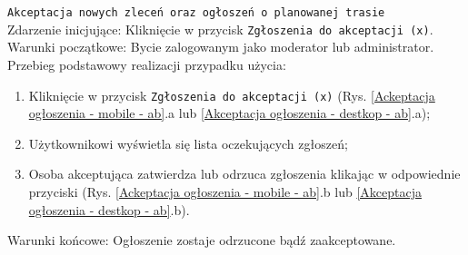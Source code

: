  \texttt{Akceptacja nowych zleceń oraz ogłoszeń o planowanej trasie} \\
 Zdarzenie inicjujące: Kliknięcie w przycisk \texttt{Zgłoszenia do akceptacji (x)}. \\
 Warunki początkowe: Bycie zalogowanym jako moderator lub administrator. \\
 Przebieg podstawowy realizacji przypadku użycia: \\
 \begin{enumerate}
    \item Kliknięcie w przycisk \texttt{Zgłoszenia do akceptacji (x)} (Rys. \ref{Ackeptacja ogłoszenia - mobile - ab}.a lub \ref{Akceptacja ogłoszenia - destkop - ab}.a);
    \item Użytkownikowi wyświetla się lista oczekujących zgłoszeń;
    \item Osoba akceptująca zatwierdza lub odrzuca zgłoszenia klikając w odpowiednie przyciski (Rys. \ref{Ackeptacja ogłoszenia - mobile - ab}.b lub \ref{Akceptacja ogłoszenia - destkop - ab}.b).
 \end{enumerate}
 Warunki końcowe: Ogłoszenie zostaje odrzucone bądź zaakceptowane. \\
